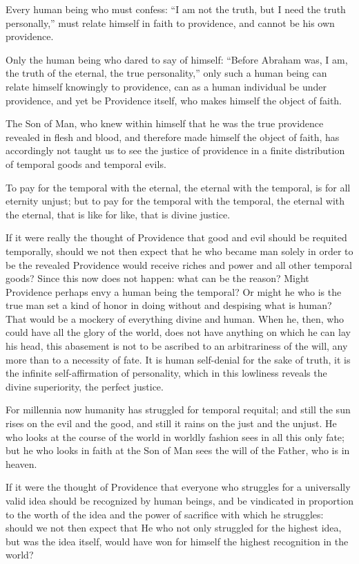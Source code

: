 \documentclass[12pt,a4paper,openany]{book}
\newcommand{\opage}[1]{\marginnote{\footnotesize\textit{[#1]}}}
\begin{document}
Every human being who must confess: ``I am
not the truth, but I need the truth
personally,'' must relate himself in faith to providence,
and cannot be his own providence.

Only the human being who dared to say of himself:
``Before Abraham was, I am, the truth
of the eternal, the true personality,'' only such a
human being can relate himself knowingly to providence,
can as a human individual be under
providence, and yet be Providence itself, who makes
himself the object of faith.

\setcounter{footnote}{0}%
\opage{24}The Son of Man, who knew within
himself that he was the true providence revealed in flesh and blood,
and therefore made himself the object of faith,
has accordingly not taught us
to see the justice of providence in a finite
distribution of temporal goods and temporal evils.

To pay for the temporal with the eternal, the
eternal with the temporal, is for all eternity unjust;
but to pay for the temporal with the
temporal, the eternal with the eternal, that is like
for like, that is divine justice.

If it were really the thought of Providence
that good and evil should be requited
temporally, should we not then expect that he who
became man solely in order to be
the revealed Providence would receive riches
and power and all other temporal goods? Since
this now does not happen: what can be the reason?
Might Providence perhaps envy a human being
the temporal? Or might he who is the
true man set a kind of honor in doing without
and despising what is human? That would be
a mockery of everything divine and human.
When he, then, who could have all the glory of the
world, does not have anything on which he can
\setcounter{footnote}{0}%
\opage{25}lay his head, this abasement is not
to be ascribed to an arbitrariness of the will, any more
than to a necessity of fate. It is human
self-denial for the sake of truth,
it is the infinite self-affirmation of personality,
which in this lowliness reveals the
divine superiority, the perfect justice.

For millennia now humanity has struggled
for temporal requital; and still the sun rises on the evil and the good, and still it rains
on the just and the unjust. He who
looks at the course of the world in worldly fashion sees in all
this only fate; but he who looks in faith
at the Son of Man sees the will of the Father,
who is in heaven.

If it were the thought of Providence that everyone
who struggles for a universally valid idea
should be recognized by human beings, and be vindicated
in proportion to the worth of the idea and the power of
sacrifice with which he struggles: should we not then
expect that He who not only struggled for the highest
idea, but was the idea itself, would have won
for himself the highest recognition in the world?
\end{document}
